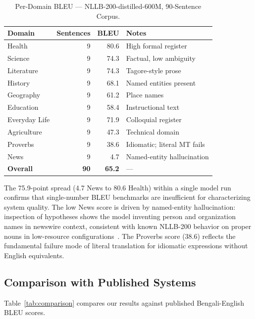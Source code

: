 \documentclass[sigconf]{acmart}
\begin{document}
\begin{table}[htbp]
\caption{Per-Domain BLEU --- NLLB-200-distilled-600M, 90-Sentence Corpus.}
\label{tab:domain_bleu}
\centering
\begin{tabular}{lrrp{2.6cm}}
\toprule
Domain & Sentences & BLEU & Notes \\
\midrule
Health         & 9 & 80.6 & High formal register \\
Science        & 9 & 74.3 & Factual, low ambiguity \\
Literature     & 9 & 74.3 & Tagore-style prose \\
History        & 9 & 68.1 & Named entities present \\
Geography      & 9 & 61.2 & Place names \\
Education      & 9 & 58.4 & Instructional text \\
Everyday Life  & 9 & 71.9 & Colloquial register \\
Agriculture    & 9 & 47.3 & Technical domain \\
Proverbs       & 9 & 38.6 & Idiomatic; literal MT fails \\
News           & 9 &  4.7 & Named-entity hallucination \\
\midrule
\textbf{Overall} & \textbf{90} & \textbf{65.2} & --- \\
\bottomrule
\end{tabular}
\end{table}

The 75.9-point spread (4.7 News to 80.6 Health) within a single model run
confirms that single-number BLEU benchmarks are insufficient for characterizing
system quality.
The low News score is driven by named-entity hallucination: inspection of
hypotheses shows the model inventing person and organization names in newswire
context, consistent with known NLLB-200 behavior on proper nouns in low-resource
configurations~\cite{nllb2022}.
The Proverbs score (38.6) reflects the fundamental failure mode of literal
translation for idiomatic expressions without English equivalents.

\subsection{Comparison with Published Systems}

Table~\ref{tab:comparison} compares our results against published Bengali-English
BLEU scores.
\end{document}
